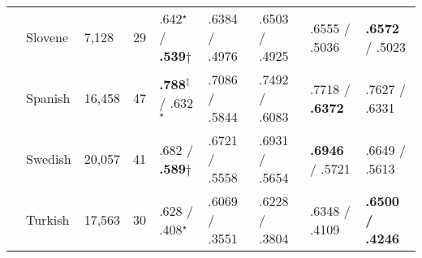 \begin{table}[ht]
\begin{flushleft}
\begin{tabular}{|@{ }l@{ }|@{ }l@{ }|@{ }l@{ }|@{ }l@{ }|@{ }l@{ }|@{ }l@{ }|@{ }l@{ }|@{ }l@{ }|@{ }l@{ }|}
        & Slovene    & 7,128   & 29   & .642$^\star$ / \textbf{.539}$\dagger$    & .6384 / .4976 & .6503 / .4925  & .6555 / .5036     & \textbf{.6572} / .5023 \\
        & Spanish    & 16,458  & 47   & \textbf{.788}$^\ddagger$ / .632$^\star$          & .7086 / .5844 & .7492 / .6083  & .7718 / \textbf{.6372}     & .7627 / .6331 \\
        & Swedish    & 20,057  & 41   & .682 / \textbf{.589}$\dagger$        & .6721 / .5558 & .6931 / .5654  & \textbf{.6946} / .5721     & .6649 / .5613 \\
        & Turkish    & 17,563  & 30   & .628 / .408$^\star$        & .6069 / .3551 & .6228 / .3804  & .6348 / .4109     & \textbf{.6500 / .4246} \\ \hline %
    \end{tabular}
  \end{flushleft}
  \label{tab:multiresults}
\end{table}
